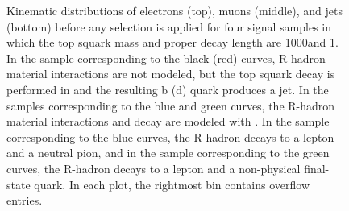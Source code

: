 \begin{figure}
\caption{
Kinematic distributions of electrons (top), muons (middle), and jets (bottom) before any selection is applied for four signal samples in which the top squark mass and proper decay length are 1000\GeV and 1\cm. In the sample corresponding to the black (red) curves, R-hadron material interactions are not modeled, but the top squark decay is performed in \PYTHIA and the resulting b (d) quark produces a jet. In the samples corresponding to the blue and green curves, the R-hadron material interactions and decay are modeled with \GEANTfour. In the sample corresponding to the blue curves, the R-hadron decays to a lepton and a neutral pion, and in the sample corresponding to the green curves, the R-hadron decays to a lepton and a non-physical final-state quark. In each plot, the rightmost bin contains overflow entries.
}
\label{r_hadrons_no_selection}
\end{figure}
